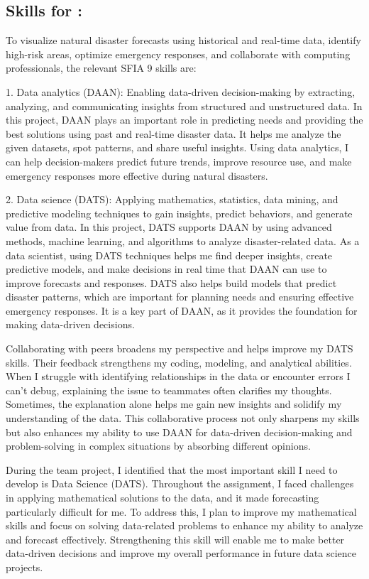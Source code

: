 \documentclass[a4paper, 11pt]{report}
\begin{document}
\subsection{Skills for \majB: \studB}

To visualize natural disaster forecasts using historical and real-time data, identify high-risk areas, optimize emergency responses, and collaborate with computing professionals, the relevant SFIA 9 skills are:

1. Data analytics (DAAN): Enabling data-driven decision-making by extracting, analyzing, and communicating insights from structured and unstructured data. In this project, DAAN plays an important role in predicting needs and providing the best solutions using past and real-time disaster data. It helps me analyze the given datasets, spot patterns, and share useful insights. Using data analytics, I can help decision-makers predict future trends, improve resource use, and make emergency responses more effective during natural disasters.


2. Data science (DATS): Applying mathematics, statistics, data mining, and predictive modeling techniques to gain insights, predict behaviors, and generate value from data. In this project, DATS supports DAAN by using advanced methods, machine learning, and algorithms to analyze disaster-related data. As a data scientist, using DATS techniques helps me find deeper insights, create predictive models, and make decisions in real time that DAAN can use to improve forecasts and responses. DATS also helps build models that predict disaster patterns, which are important for planning needs and ensuring effective emergency responses. It is a key part of DAAN, as it provides the foundation for making data-driven decisions.

Collaborating with peers broadens my perspective and helps improve my DATS skills. Their feedback strengthens my coding, modeling, and analytical abilities. When I struggle with identifying relationships in the data or encounter errors I can't debug, explaining the issue to teammates often clarifies my thoughts. Sometimes, the explanation alone helps me gain new insights and solidify my understanding of the data. This collaborative process not only sharpens my skills but also enhances my ability to use DAAN for data-driven decision-making and problem-solving in complex situations by absorbing different opinions.

During the team project, I identified that the most important skill I need to develop is Data Science (DATS). Throughout the assignment, I faced challenges in applying mathematical solutions to the data, and it made forecasting particularly difficult for me. To address this, I plan to improve my mathematical skills and focus on solving data-related problems to enhance my ability to analyze and forecast effectively. Strengthening this skill will enable me to make better data-driven decisions and improve my overall performance in future data science projects.
\end{document}
